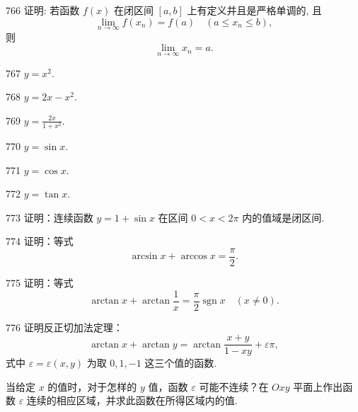 \begin{prob}[M]{766}
证明: 若函数 $f(x)$ 在闭区间 $[a, b]$ 上有定义并且是严格单调的, 且
\[
\lim_{n \to \infty} f(x_n) = f(a) \quad (a \leqslant x_n \leqslant b),
\]
则
\[
\lim_{n \to \infty} x_n = a.
\]
\end{prob}


\begin{prob}[S]{767}
$y = x^2.$
\end{prob}

\begin{prob}[S]{768}
$y = 2x - x^2.$
\end{prob}

\begin{prob}[S]{769}
$y = \frac{2x}{1 + x^2}.$
\end{prob}

\begin{prob}[S]{770}
$y = \sin x.$
\end{prob}

\begin{prob}[S]{771}
$y = \cos x.$
\end{prob}

\begin{prob}[S]{772}
$y = \tan x.$
\end{prob}

\begin{prob}[M]{773}
证明：连续函数 $y = 1 + \sin x$ 在区间 $0 < x < 2\pi$ 内的值域是闭区间.
\end{prob}

\begin{prob}[M]{774}
证明：等式
\[
\arcsin x + \arccos x = \frac{\pi}{2}.
\]
\end{prob}

\begin{prob}[M]{775}
证明：等式
\[
\arctan x + \arctan \frac{1}{x} = \frac{\pi}{2}\operatorname{sgn} x \quad (x \neq 0).
\]
\end{prob}

\begin{prob}[L]{776}
证明反正切加法定理：
\[
\arctan x + \arctan y = \arctan \frac{x + y}{1 - xy} + \varepsilon \pi,
\]
式中 $\varepsilon = \varepsilon(x, y)$ 为取 $0, 1, -1$ 这三个值的函数.

当给定 $x$ 的值时，对于怎样的 $y$ 值，函数 $\varepsilon$ 可能不连续？在 $Oxy$ 平面上作出函数 $\varepsilon$ 连续的相应区域，并求此函数在所得区域内的值.
\end{prob}

